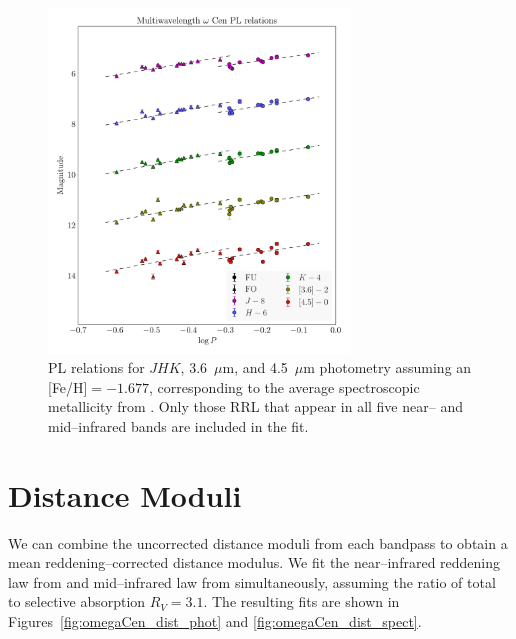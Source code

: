 \documentclass[a4paper,fleqn,usenatbib]{mnras}
\begin{document}
\begin{figure}
\begin{center}
\includegraphics[width=80mm]{final_plots/multiwavelength_PL_samestars_spect.pdf}
\caption{PL relations for $J\!H\!K$, 3.6~$\mu$m, and 4.5~$\mu$m photometry assuming an [Fe/H]$=-1.677$, corresponding to the average spectroscopic metallicity from \citet{2006ApJ...640L..43S}.  Only those RRL that appear in all five near-- and mid--infrared bands are included in the fit.}
\label{fig:omegaCen_pl_spect}
\end{center}
\end{figure}


\section{Distance Moduli}
\label{sec:distance_moduli}

We can combine the uncorrected distance moduli from each bandpass to obtain a mean reddening--corrected distance modulus. We fit the near--infrared reddening law from \citet{1989ApJ...345..245C} and mid--infrared law from \citet{2005ApJ...619..931I} simultaneously, assuming the ratio of total to selective absorption $R_V = 3.1$. The resulting fits are shown in Figures~\ref{fig:omegaCen_dist_phot} and \ref{fig:omegaCen_dist_spect}.

\end{document}
